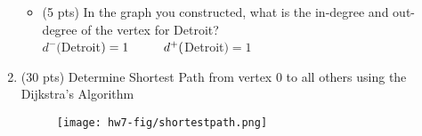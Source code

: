 \documentclass[11pt]{article}
\newcommand{\rowstyle}[1]{\gdef\currentrowstyle{#1}%
  #1\ignorespaces
}
\newcommand\tab[1][1cm]{\hspace*{#1}}
\begin{document}
\begin{enumerate}
  \begin{itemize}
    \item (5 pts) In the graph you constructed, what is the in-degree and out-degree of the vertex for Detroit? \\
      \tab $d^-($Detroit$)=1 \tab d^+($Detroit$)=1$
  \end{itemize}


\item (30 pts) Determine Shortest Path from vertex 0 to all others using the Dijkstra’s Algorithm

\begin{figure}[!ht]
  \begin{center}
  \texttt{[image: hw7-fig/shortestpath.png]}
  \end{center}
  \end{figure}

  \begin{center}
  \end{center}


 \end{enumerate}
\end{document}

